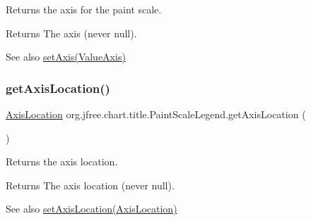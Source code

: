 Returns the axis for the paint scale.

\begin{DoxyReturn}{Returns}
The axis (never {\ttfamily null}).
\end{DoxyReturn}
\begin{DoxySeeAlso}{See also}
\mbox{\hyperlink{classorg_1_1jfree_1_1chart_1_1title_1_1_paint_scale_legend_a45cf98fb34e5987f23c42f5d95a52de7}{set\+Axis(\+Value\+Axis)}} 
\end{DoxySeeAlso}
\mbox{\label{classorg_1_1jfree_1_1chart_1_1title_1_1_paint_scale_legend_a20d245ad308c3f67e6fe3a41d1c66607}} 
\subsubsection{\texorpdfstring{get\+Axis\+Location()}{getAxisLocation()}}
{\footnotesize\ttfamily \mbox{\hyperlink{classorg_1_1jfree_1_1chart_1_1axis_1_1_axis_location}{Axis\+Location}} org.\+jfree.\+chart.\+title.\+Paint\+Scale\+Legend.\+get\+Axis\+Location (\begin{DoxyParamCaption}{ }\end{DoxyParamCaption})}

Returns the axis location.

\begin{DoxyReturn}{Returns}
The axis location (never {\ttfamily null}).
\end{DoxyReturn}
\begin{DoxySeeAlso}{See also}
\mbox{\hyperlink{classorg_1_1jfree_1_1chart_1_1title_1_1_paint_scale_legend_a28c75f6f500d49d0bb28b0cf02334bea}{set\+Axis\+Location(\+Axis\+Location)}} 
\end{DoxySeeAlso}
\mbox{\label{classorg_1_1jfree_1_1chart_1_1title_1_1_paint_scale_legend_a94ff06f97ef21ee084df263ad1aa55d3}} 
